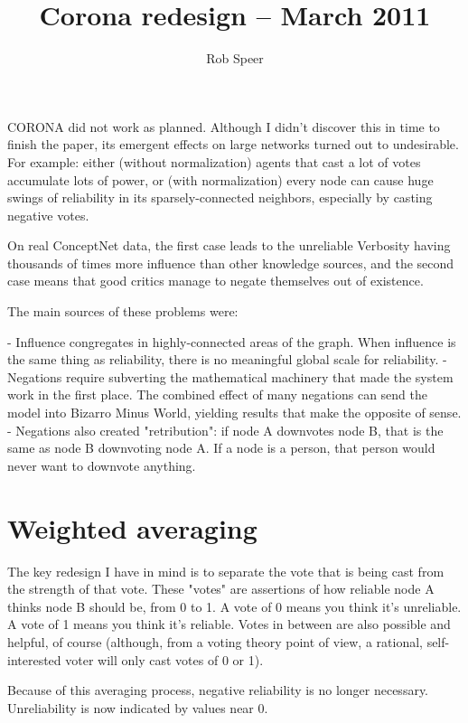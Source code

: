 
\title{Corona redesign -- March 2011}
\author{Rob Speer}


\maketitle

CORONA did not work as planned. Although I didn't discover this in time to
finish the paper, its emergent effects on large networks turned out to
undesirable.  For example: either (without normalization) agents that cast a
lot of votes accumulate lots of power, or (with normalization) every node can
cause huge swings of reliability in its sparsely-connected neighbors,
especially by casting negative votes.

On real ConceptNet data, the first case leads to the unreliable Verbosity
having thousands of times more influence than other knowledge sources, and the
second case means that good critics manage to negate themselves out of
existence.

The main sources of these problems were:

- Influence congregates in highly-connected areas of the graph. When influence
  is the same thing as reliability, there is no meaningful global scale for
  reliability.
- Negations require subverting the mathematical machinery that made the system
  work in the first place. The combined effect of many negations can send the
  model into Bizarro Minus World, yielding results that make the opposite of
  sense.
- Negations also created "retribution": if node A downvotes node B, that is the
  same as node B downvoting node A. If a node is a person, that person would
  never want to downvote anything.

\section{Weighted averaging}

The key redesign I have in mind is to separate the vote that is being cast from
the strength of that vote. These "votes" are assertions of how reliable node A
thinks node B should be, from 0 to 1. A vote of 0 means you think it's
unreliable. A vote of 1 means you think it's reliable. Votes in between are
also possible and helpful, of course (although, from a voting theory point of
view, a rational, self-interested voter will only cast votes of 0 or 1).

Because of this averaging process, negative reliability is no longer necessary.
Unreliability is now indicated by values near 0.

